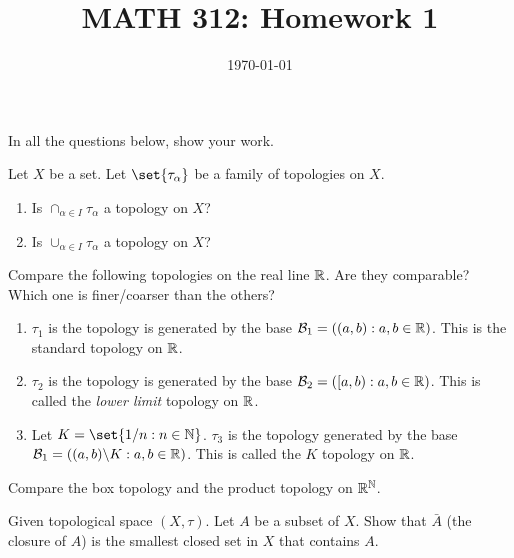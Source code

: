 \documentclass[12pt]{amsart}
\title{ MATH 312: Homework 1 }
\author{}
\date{\today}
\begin{document}
\maketitle



\printbibliography

In all the questions below, show your work.

\begin{question}
	Let $X$ be a set.
	Let $\set{\tau_\alpha}$ be a family of topologies on $X$.
	\begin{enumerate}
		\item Is $\cap_{\alpha \in I} \tau_\alpha$ a topology on $X$?
		\item Is $\cup_{\alpha \in I} \tau_\alpha$ a topology on $X$?
	\end{enumerate}
\end{question}

\begin{question}
	Compare the following topologies on the real line $\mathbb{R}$.
	Are they comparable?
	Which one is finer/coarser than the others?

	\begin{enumerate}
		\item $\tau_1$ is the topology is generated by the base $\mathcal{B}_1 = \left( (a,b): a,b \in \mathbb{R}  \right)$.
		      This is the standard topology on $\mathbb{R}$.
		\item $\tau_2$ is the topology is generated by the base $\mathcal{B}_2 = \left( [a,b): a,b \in \mathbb{R}  \right)$.
		      This is called the \emph{lower limit} topology on $\mathbb{R}$.
		\item Let $K = \set{ 1/n : n\in \N}$. $\tau_3$ is the topology generated by the base
		      $\mathcal{B}_1 = \left( (a,b) \backslash K : a,b \in \mathbb{R}  \right)$.
		      This is called the $K$ topology on $\mathbb{R}$.
	\end{enumerate}
\end{question}



\begin{question}
	Compare the box topology and the product topology on $\mathbb{R}^{\mathbb{N}}$.
\end{question}


\begin{question}
	Given topological space $(X, \tau)$.
	Let $A$ be a subset of $X$.
	Show that $\bar A$ (the closure of $A$) is the smallest closed set in $X$
	that contains $A$.
\end{question}
\end{document}
